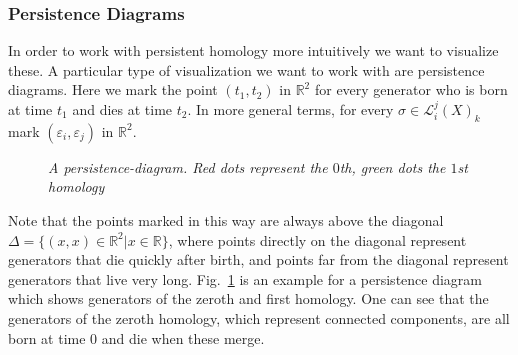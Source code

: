 \documentclass[11pt, a4paper, UKenglish]{article}
\newcommand{\bR}{\mathbb{R}}
\begin{document}
    \subsubsection{Persistence Diagrams}\label{subsec:persistence-diagrams}
    In order to work with persistent homology more intuitively we want to visualize these.
    A particular type of visualization we want to work with are persistence diagrams.
    Here we mark the point $(t_1,t_2)$ in $\bR^2$ for every generator who is born at time $t_1$ and dies at time $t_2$.
    In more general terms, for every $\sigma\in\mathcal{L}_i^j(X)_k$ mark $(\varepsilon_i,\varepsilon_j)$ in $\bR^2$.
    \begin{figure}
        \centering
        \caption{\textit{A persistence-diagram.
        Red dots represent the $0$th, green dots the $1$st homology}}
        \label{fig2}
    \end{figure}

	Note that the points marked in this way are always above the diagonal $\Delta=\{(x,x)\in\bR^2|x\in\bR\}$, where points directly on the diagonal represent generators that die quickly after birth, and points far from the diagonal represent generators that live very long.
    Fig.\ \ref{fig2} is an example for a persistence diagram which shows generators of the zeroth and first homology.
    One can see that the generators of the zeroth homology, which represent connected components, are all born at time $0$ and die when these merge.\\
\end{document}
